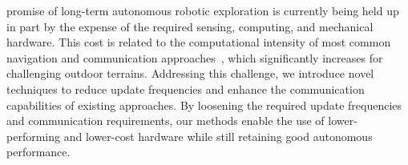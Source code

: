 \documentclass[lettersize,journal,twoside]{IEEEtran}
\theoremstyle{definition}
\begin{document}
 promise of long-term autonomous robotic exploration is currently being held up in part by the expense of the required sensing, computing, and mechanical hardware. %
This cost is related to the computational intensity of most common navigation and communication approaches~\cite{lluvia2021active,placed2022survey}, which significantly increases for challenging outdoor terrains. Addressing this challenge, we introduce novel techniques to reduce update frequencies and enhance the communication capabilities of existing approaches. By loosening the required update frequencies and communication requirements, our methods enable the use of lower-performing and lower-cost hardware while still retaining good autonomous performance.
\end{document}

